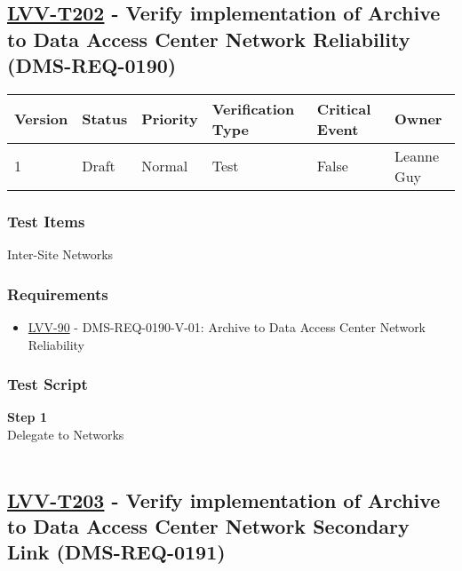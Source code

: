 \hypertarget{lvv-t202---verify-implementation-of-archive-to-data-access-center-network-reliability-dms-req-0190}{%
\subsection{\texorpdfstring{\href{https://jira.lsstcorp.org/secure/Tests.jspa\#/testCase/LVV-T202}{LVV-T202}
- Verify implementation of Archive to Data Access Center Network
Reliability
(DMS-REQ-0190)}{LVV-T202 - Verify implementation of Archive to Data Access Center Network Reliability (DMS-REQ-0190)}}\label{lvv-t202---verify-implementation-of-archive-to-data-access-center-network-reliability-dms-req-0190}}

\begin{longtable}[]{@{}llllll@{}}
\toprule
Version & Status & Priority & Verification Type & Critical Event &
Owner\tabularnewline
\midrule
\endhead
1 & Draft & Normal & Test & False & Leanne Guy\tabularnewline
\bottomrule
\end{longtable}

\hypertarget{test-items-178}{%
\subsubsection{Test Items}\label{test-items-178}}

Inter-Site Networks~

\hypertarget{requirements-179}{%
\subsubsection{Requirements}\label{requirements-179}}

\begin{itemize}
\tightlist
\item
  \href{https://jira.lsstcorp.org/browse/LVV-90}{LVV-90} -
  DMS-REQ-0190-V-01: Archive to Data Access Center Network Reliability
\end{itemize}

\hypertarget{test-script-179}{%
\subsubsection{Test Script}\label{test-script-179}}

\textbf{Step 1}\\
Delegate to Networks\\
~\\

\hypertarget{lvv-t203---verify-implementation-of-archive-to-data-access-center-network-secondary-link-dms-req-0191}{%
\subsection{\texorpdfstring{\href{https://jira.lsstcorp.org/secure/Tests.jspa\#/testCase/LVV-T203}{LVV-T203}
- Verify implementation of Archive to Data Access Center Network
Secondary Link
(DMS-REQ-0191)}{LVV-T203 - Verify implementation of Archive to Data Access Center Network Secondary Link (DMS-REQ-0191)}}\label{lvv-t203---verify-implementation-of-archive-to-data-access-center-network-secondary-link-dms-req-0191}}

